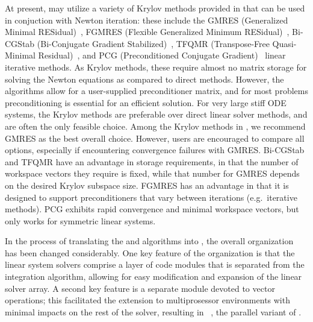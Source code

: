 At present, {\cvode} may utilize a variety of Krylov methods provided
in {\sundials} that can be used in conjuction with Newton iteration:
these include the GMRES (Generalized Minimal RESidual)~\cite{SaSc:86},
FGMRES (Flexible Generalized Minimum RESidual)~\cite{Saa:93},
Bi-CGStab (Bi-Conjugate Gradient Stabilized)~\cite{Van:92}, TFQMR
(Transpose-Free Quasi-Minimal Residual)~\cite{Fre:93}, and PCG
(Preconditioned Conjugate Gradient)~\cite{HeSt:52} linear iterative
methods.  As Krylov methods, these require almost no
matrix storage for solving the Newton equations as compared to direct
methods. However, the algorithms allow for a user-supplied preconditioner
matrix, and for most problems preconditioning is essential for an
efficient solution.
For very large stiff ODE systems, the Krylov methods are preferable over
direct linear solver methods, and are often the only feasible choice.
Among the Krylov methods in {\sundials}, we recommend GMRES as the
best overall choice.  However, users are encouraged to compare all
options, especially if encountering convergence failures with GMRES.
Bi-CGStab and TFQMR have an advantage in storage requirements, in
that the number of workspace vectors they require is fixed, while that
number for GMRES depends on the desired Krylov subspace size.  FGMRES
has an advantage in that it is designed to support preconditioners
that vary between iterations (e.g.~iterative methods).  PCG exhibits
rapid convergence and minimal workspace vectors, but only works for
symmetric linear systems.

In the process of translating the {\vode} and {\vodpk} algorithms into
{\CC}, the overall {\cvode} organization has been changed considerably.
One key feature of the {\cvode} organization is that the linear system
solvers comprise a layer of code modules that is separated from the
integration algorithm, allowing for easy modification and expansion of
the linear solver array.  A second key feature is a separate module
devoted to vector operations; this facilitated the extension to
multiprosessor environments with minimal impacts on the rest of the
solver, resulting in {\pvode}~\cite{ByHi:99},
the parallel variant of {\cvode}.  

